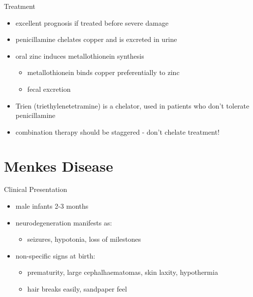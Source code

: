 \documentclass[presentation, smaller]{beamer}
\begin{document}
\begin{frame}[label={sec:org566055f}]{Treatment}
\begin{itemize}
\item excellent prognosis if treated before severe damage
\item penicillamine chelates copper and is excreted in urine
\item oral zinc induces metallothionein synthesis
\begin{itemize}
\item metallothionein binds copper preferentially to zinc
\item fecal excretion
\end{itemize}
\item Trien (triethylenetetramine) is a chelator, used in patients who don't tolerate penicillamine
\item combination therapy should be staggered - don't chelate treatment!
\end{itemize}
\end{frame}


\section{Menkes Disease}
\label{sec:orgc5980b2}

\begin{frame}[label={sec:orgae61583}]{Clinical Presentation}
\begin{itemize}
\item male infants 2-3 months
\item neurodegeneration manifests as:
\begin{itemize}
\item seizures, hypotonia, loss of milestones
\end{itemize}
\item non-specific signs at birth:
\begin{itemize}
\item prematurity, large cephalhaematomas, skin laxity, hypothermia
\item hair breaks easily, sandpaper feel
\end{itemize}
\end{itemize}
\end{frame}
\end{document}
